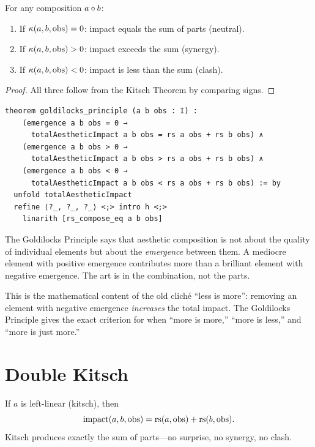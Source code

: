 \begin{theorem}
\label{thm:goldilocks}
For any composition $a \circ b$:
\begin{enumerate}
\item If $\kappa(a, b, \mathrm{obs}) = 0$: impact equals the sum of parts (neutral).
\item If $\kappa(a, b, \mathrm{obs}) > 0$: impact exceeds the sum (synergy).
\item If $\kappa(a, b, \mathrm{obs}) < 0$: impact is less than the sum (clash).
\end{enumerate}
\end{theorem}

\begin{proof}
All three follow from the Kitsch Theorem by comparing signs.
\end{proof}

\begin{lstlisting}
theorem goldilocks_principle (a b obs : I) :
    (emergence a b obs = 0 →
      totalAestheticImpact a b obs = rs a obs + rs b obs) ∧
    (emergence a b obs > 0 →
      totalAestheticImpact a b obs > rs a obs + rs b obs) ∧
    (emergence a b obs < 0 →
      totalAestheticImpact a b obs < rs a obs + rs b obs) := by
  unfold totalAestheticImpact
  refine ⟨?_, ?_, ?_⟩ <;> intro h <;>
    linarith [rs_compose_eq a b obs]
\end{lstlisting}

\begin{interpretation}
The Goldilocks Principle says that aesthetic composition is not about
the quality of individual elements but about the \emph{emergence} between
them.  A mediocre element with positive emergence contributes more than
a brilliant element with negative emergence.  The art is in the
combination, not the parts.

This is the mathematical content of the old clich\'e ``less is more'':
removing an element with negative emergence \emph{increases} the total
impact.  The Goldilocks Principle gives the exact criterion for when
``more is more,'' ``more is less,'' and ``more is just more.''
\end{interpretation}

\section{Double Kitsch}

\begin{theorem}
\label{thm:double-kitsch}
If $a$ is left-linear (kitsch), then
\[
  \mathrm{impact}(a, b, \mathrm{obs}) = \mathrm{rs}(a, \mathrm{obs}) + \mathrm{rs}(b, \mathrm{obs}).
\]
Kitsch produces exactly the sum of parts---no surprise, no synergy,
no clash.
\end{theorem}

